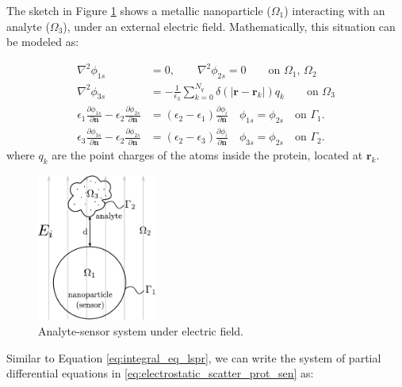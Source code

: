 The sketch in Figure \ref{fig:analyte-sensor} shows a metallic nanoparticle ($\Omega_1$) interacting with an analyte ($\Omega_3$), under an external electric field.
Mathematically, this situation can be modeled as:

\begin{align}\label{eq:electrostatic_scatter_prot_sen}
\nabla^2 \phi_{1s} &= 0, \qquad \nabla^2 \phi_{2s} = 0 \qquad\text{on $\Omega_1$, $\Omega_2$} \nonumber\\
\nabla^2 \phi_{3s} &= -\frac{1}{\epsilon_3} \sum_{k=0}^{N_q} \delta(|\mathbf{r}-\mathbf{r}_k|) q_k \qquad\text{on $\Omega_3$} \nonumber \\
\epsilon_1\frac{\partial\phi_{1s}}{\partial \mathbf{n}} - \epsilon_2\frac{\partial\phi_{2s}}{\partial\mathbf{n}} &= (\epsilon_2-\epsilon_1)\frac{\partial\phi_i}{\partial\mathbf{n}} \quad \phi_{1s} = \phi_{2s} \quad \text{on $\Gamma_1$}. \nonumber\\
\epsilon_3\frac{\partial\phi_{3s}}{\partial \mathbf{n}} - \epsilon_2\frac{\partial\phi_{2s}}{\partial\mathbf{n}} &= (\epsilon_2-\epsilon_3)\frac{\partial\phi_i}{\partial\mathbf{n}} \quad \phi_{3s} = \phi_{2s} \quad \text{on $\Gamma_2$}.
\end{align}
%
where $q_k$ are the point charges of the atoms inside the protein, located at $\mathbf{r}_k$.

\begin{figure}%
   \centering
   \includegraphics[width=0.35\textwidth]{protein_sensor_regions.pdf} 
   \caption{Analyte-sensor system under electric field.}
   \label{fig:analyte-sensor}
\end{figure}

Similar to Equation \eqref{eq:integral_eq_lspr}, we can write the system of partial differential equations in 
\eqref{eq:electrostatic_scatter_prot_sen} as:

